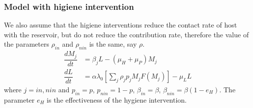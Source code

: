 \documentclass[12pt,a4paper]{article}
\theoremstyle{plain}%
\theoremstyle{definition}
\theoremstyle{remark}
\begin{document}
	\subsubsection{Model with higiene intervention}
	We also assume that the higiene interventions reduce the contact rate of host with the reservoir, but do not reduce the contribution rate, therefore the value of the parameters $\rho_{in}$ and $\rho_{nin}$ is the same, say $\rho$.
	\begin{equation}
	\begin{split}
	\dfrac{dM_j}{dt}&=\beta_j L - (\mu_H+\mu_P) M_j\\%
	\dfrac{dL}{dt}&= \alpha \lambda_0 \left[ \sum_j \rho_j p_j M_j F(M_j)\right]   - \mu_L L 
	\end{split}
	\end{equation} 
	where $j=in,nin$ and 
	$p_{in}=p$, $p_{nin}=1-p$, $\beta_{in}=\beta$, $\beta_{nin}=\beta(1-e_H)$. The parameter $e_H$ is the effectiveness of the hygiene intervention. 
	
\end{document}
